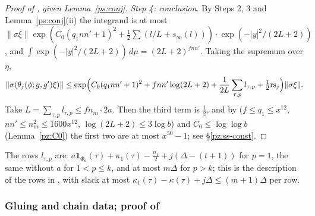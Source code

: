 \documentclass[10pt]{amsart}
\theoremstyle{definition}
\theoremstyle{remark}
\providecommand{\auPa}{\Phi_a}
\providecommand{\ausinf}{s_\infty}
\begin{document}
\begin{proof}[Proof of {\cite[Proposition~14.23]{P46}}, given Lemma~\ref{ps:conj}]
\emph{Step 4: conclusion.} By Steps 2, 3 and Lemma~\ref{ps:conj}(ii) the integrand is at most
$\|\sigma\xi\|\exp(C_0(q_1nn'+1)^2+\tfrac12\sum(l/L+\ausinf(l)))\cdot\exp(-|y|^2/(2L+2))$, and
$\int\exp(-|y|^2/(2L+2))\,d\mu=(2L+2)^{fnn'}$. Taking the supremum over $\eta$,
\[
\|\sigma(\theta_j(\phi;g,g')\xi)\|\le\exp\Bigl(C_0(q_1nn'+1)^2+fnn'\log(2L+2)+\frac1{2L}\sum_{\tau,p}
l_{\tau,p}+\tfrac12\mathrm{rs}_j\Bigr)\|\sigma\xi\| .
\]
Take $L=\sum_{\tau,p}l_{\tau,p}\le fn_m\cdot2a$. Then the third term is $\tfrac12$, and by
{\cite[Lemma~13.4]{P46}} ($f\le q_1\le x^{12}$, $nn'\le n_m^2\le1600x^{12}$, $\log(2L+2)\le3\log
b$) and $C_0\le\log\log b$ (Lemma~\ref{pz:C0}) the first two are at most $x^{50}-1$; see \S\ref{pz:ss-const}.
\end{proof}
The rows $l_{\tau,p}$ are: $a\mathbf 1_{\auPa}(\tau)+\kappa_1(\tau)-\tfrac{n_1}2+j(\Delta-(t+1))$
for $p=1$, the same without $a$ for $1<p\le k$, and at most $m\Delta$ for $p>k$; this is the
description of the rows in {\cite[\S14.8]{P46}}, with slack at most $\kappa_1(\tau)-\kappa(\tau)+j\Delta\le(m+1)\Delta$ per row.

\subsubsection{Gluing and chain data; proof of \texorpdfstring{{\cite[Proposition~14.25]{P46}}}{[Row D, Proposition~14.25]}}\label{ps:ss-glue}
\end{document}
